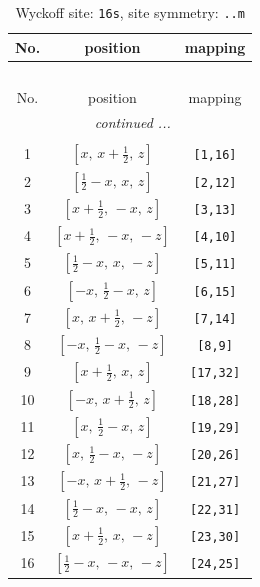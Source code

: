 \documentclass[fleqn,8pt]{jsarticle}
\begin{document}
\renewcommand{\arraystretch}{1.2}
\begin{longtable}{ccc}
\caption{Wyckoff site: {\tt 16s}, site symmetry: {\tt ..m}}
 \\
 \hline \hline
No. & position & mapping \\ \hline \endfirsthead

\multicolumn{2}{l}{\tablename\ \thetable{}} \\
 \hline \hline
No. & position & mapping \\ \hline \endhead

 \hline \hline
\multicolumn{2}{r}{\footnotesize\it continued ...} \\ \endfoot

 \hline \hline
\multicolumn{2}{r}{} \\ \endlastfoot

1 & $\left[ x,\, x + \frac{1}{2},\, z \right]$ & {\tt [1,16]} \\ \hline
2 & $\left[ \frac{1}{2} - x,\, x,\, z \right]$ & {\tt [2,12]} \\ \hline
3 & $\left[ x + \frac{1}{2},\, - x,\, z \right]$ & {\tt [3,13]} \\ \hline
4 & $\left[ x + \frac{1}{2},\, - x,\, - z \right]$ & {\tt [4,10]} \\ \hline
5 & $\left[ \frac{1}{2} - x,\, x,\, - z \right]$ & {\tt [5,11]} \\ \hline
6 & $\left[ - x,\, \frac{1}{2} - x,\, z \right]$ & {\tt [6,15]} \\ \hline
7 & $\left[ x,\, x + \frac{1}{2},\, - z \right]$ & {\tt [7,14]} \\ \hline
8 & $\left[ - x,\, \frac{1}{2} - x,\, - z \right]$ & {\tt [8,9]} \\ \hline
9 & $\left[ x + \frac{1}{2},\, x,\, z \right]$ & {\tt [17,32]} \\ \hline
10 & $\left[ - x,\, x + \frac{1}{2},\, z \right]$ & {\tt [18,28]} \\ \hline
11 & $\left[ x,\, \frac{1}{2} - x,\, z \right]$ & {\tt [19,29]} \\ \hline
12 & $\left[ x,\, \frac{1}{2} - x,\, - z \right]$ & {\tt [20,26]} \\ \hline
13 & $\left[ - x,\, x + \frac{1}{2},\, - z \right]$ & {\tt [21,27]} \\ \hline
14 & $\left[ \frac{1}{2} - x,\, - x,\, z \right]$ & {\tt [22,31]} \\ \hline
15 & $\left[ x + \frac{1}{2},\, x,\, - z \right]$ & {\tt [23,30]} \\ \hline
16 & $\left[ \frac{1}{2} - x,\, - x,\, - z \right]$ & {\tt [24,25]} \\
\end{longtable}
\end{document}
